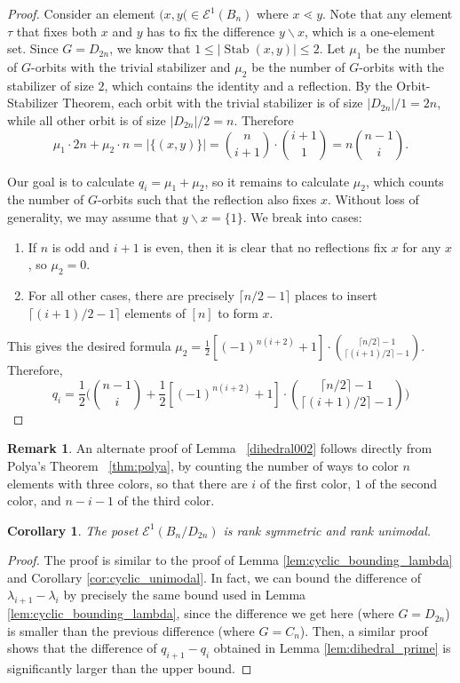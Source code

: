 \documentclass[10 pt]{amsart}
\theoremstyle{plain}
\newtheorem{cor}[thm]{Corollary}
\theoremstyle{definition}
\newtheorem{rem}[thm]{Remark}
\theoremstyle{remark}
\numberwithin{equation}{section}
\newcommand{\minus}{\backslash}
\newcommand{\dstyle}{\displaystyle}
\def\Stab{\operatorname{Stab}}
\begin{document}
\begin{proof}
Consider an element $(x , y( \in \mathcal E^1(B_n)$ where $x \lessdot y$. Note that any element $\tau $ that fixes both $x$ and $y$ has to fix the difference $y\minus x$, which is a one-element set. Since $G = D_{2n}$, 
we know that $1\leq |\Stab (x , y)| \leq 2$.   
Let $\mu_1$ be the number of $G$-orbits with the trivial stabilizer and $\mu_2$ be the number of $G$-orbits with the stabilizer of size $2$, which contains the identity and a reflection. By the Orbit-Stabilizer Theorem, each orbit with the trivial stabilizer is of size $|D_{2n}| /1 = 2n $, while all other orbit is of size $|D_{2n}|/2 = n$.  Therefore $$\mu_1 \cdot 2n + \mu_2 \cdot n = |\{(x, y)\}| = {n \choose {i+1}}  \cdot {{i+1} \choose 1} = n {n-1 \choose i }.$$

Our goal is to calculate $q_i = \mu_1 + \mu_2$, so it remains to calculate $\mu_2$, which counts the number of $G$-orbits such that the reflection also fixes $x$. Without loss of generality, we may assume that $y\minus x = \{1\}$. 
We break into cases:
\begin{enumerate}
\item If $n$ is odd and $i+1$ is even, then it is clear that no reflections fix $x$ for any $x$, so $\mu_2=0$. 
\item For all other cases, there are precisely $\lceil n/2 -1\rceil$ places to insert $\lceil (i+1)/2 - 1 \rceil$ elements of $[n]$ to form $x$. 
\end{enumerate}
This gives the desired formula $\dstyle \mu_2 =  \frac{1}{2} [(-1)^{n(i+2)}+1] \cdot { \lceil n/2\rceil -1  \choose \lceil (i+1)/2 \rceil - 1}   $. Therefore, 
$$q_i = \frac{1}{2} \Big( {n-1 \choose i } + \frac{1}{2} [(-1)^{n(i+2)}+1] \cdot { \lceil n/2\rceil -1  \choose \lceil (i+1)/2 \rceil - 1}    \Big)$$
\end{proof}
\begin{rem}
An alternate proof of Lemma ~\ref{dihedral002} follows directly from Polya's Theorem ~\ref{thm:polya}, by counting the number of ways to color $n$ elements with three colors, so that there are $i$ of the first color, $1$ of the second color, and $n-i-1$ of the third color.
\end{rem}

\begin{cor}{\label{dihedral003}} 
The poset $\mathcal E^1(B_n/D_{2n})$ is rank symmetric and rank unimodal.
\end{cor}

\begin{proof}
The proof is similar to the proof of Lemma \ref{lem:cyclic_bounding_lambda} and Corollary \ref{cor:cyclic_unimodal}. In fact, we can bound the difference of $\lambda_{i+1} - \lambda_i$ by precisely the same bound used in Lemma \ref{lem:cyclic_bounding_lambda}, since the difference we get here (where $G = D_{2n}$) is smaller than the previous difference (where $G= C_n$). Then, a similar proof shows that the difference of $q_{i+1} - q_i$ obtained  in Lemma \ref{lem:dihedral_prime} is significantly larger than the upper bound.
\end{proof}
\end{document}
